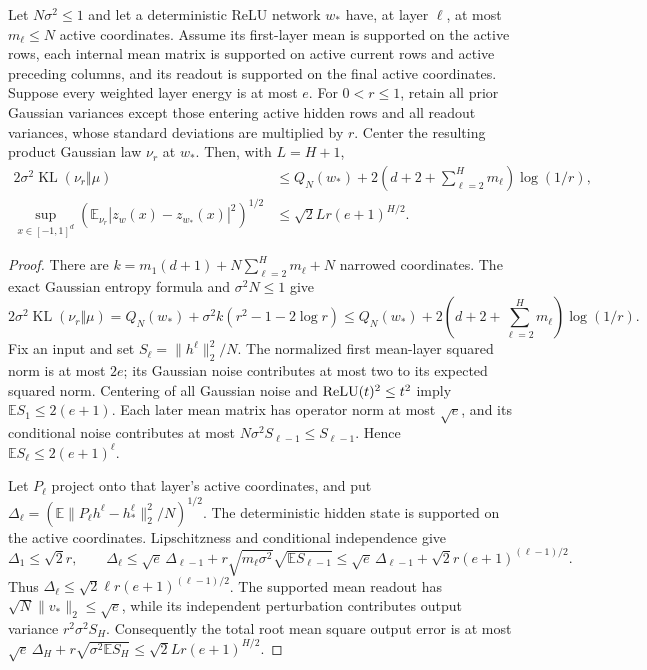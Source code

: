 \begin{lemma}
\label{lem:relu-profile-comparison}
Let $N\sigma^2\le1$ and let a deterministic ReLU network $w_*$
have, at layer $\ell$, at most $m_\ell\le N$ active coordinates.
Assume its first-layer mean is supported on the active rows, each
internal mean matrix is supported on active current rows and active
preceding columns, and its readout is supported on the final active
coordinates. Suppose every weighted layer energy is at most $e$.
For $0<r\le1$, retain all prior Gaussian variances except those
entering active hidden rows and all readout variances, whose standard
deviations are multiplied by $r$. Center the resulting product Gaussian
law $\nu_r$ at $w_*$. Then, with $L=H+1$,
\begin{align*}
 2\sigma^2\operatorname{KL}(\nu_r\Vert\mu)
 &\le Q_N(w_*)+2\left(d+2+\sum_{\ell=2}^Hm_\ell\right)\log(1/r),\\
 \sup_{x\in[-1,1]^d}
 \left(\mathbb E_{\nu_r}|z_w(x)-z_{w_*}(x)|^2\right)^{1/2}
 &\le\sqrt2 Lr(e+1)^{H/2}.
\end{align*}
\end{lemma}
\begin{proof}
There are
$k=m_1(d+1)+N\sum_{\ell=2}^Hm_\ell+N$ narrowed coordinates.
The exact Gaussian entropy formula and $\sigma^2N\le1$ give
\[
 2\sigma^2\operatorname{KL}(\nu_r\Vert\mu)
 =Q_N(w_*)+\sigma^2k(r^2-1-2\log r)
 \le Q_N(w_*)+2\left(d+2+\sum_{\ell=2}^Hm_\ell\right)\log(1/r).
\]
Fix an input and set $S_\ell=\|h^\ell\|_2^2/N$. The normalized
first mean-layer squared norm is at most $2e$; its Gaussian noise
contributes at most two to its expected squared norm. Centering of
all Gaussian noise and $\operatorname{ReLU}(t)^2\le t^2$ imply
$\mathbb E S_1\le2(e+1)$. Each later mean matrix has operator norm
at most $\sqrt e$, and its conditional noise contributes at most
$N\sigma^2S_{\ell-1}\le S_{\ell-1}$. Hence
$\mathbb E S_\ell\le2(e+1)^\ell$.

Let $P_\ell$ project onto that layer's active coordinates, and put
$\Delta_\ell=(\mathbb E\|P_\ell h^\ell-h_*^\ell\|_2^2/N)^{1/2}$.
The deterministic hidden state is supported on the active coordinates.
Lipschitzness and conditional independence give
\[
 \Delta_1\le\sqrt2r,\qquad
 \Delta_\ell\le\sqrt e\,\Delta_{\ell-1}
       +r\sqrt{m_\ell\sigma^2}\sqrt{\mathbb E S_{\ell-1}}
 \le\sqrt e\,\Delta_{\ell-1}
       +\sqrt2r(e+1)^{(\ell-1)/2}.
\]
Thus $\Delta_\ell\le\sqrt2\ell r(e+1)^{(\ell-1)/2}$.
The supported mean readout has $\sqrt N\|v_*\|_2\le\sqrt e$,
while its independent perturbation contributes output variance
$r^2\sigma^2S_H$. Consequently the total root mean square output
error is at most
$\sqrt e\,\Delta_H+r\sqrt{\sigma^2\mathbb E S_H}
\le\sqrt2 Lr(e+1)^{H/2}$.
\end{proof}

